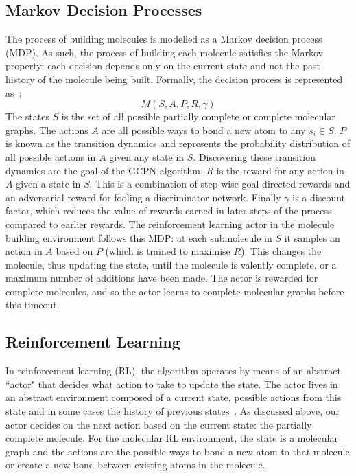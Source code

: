 \documentclass{article}
\begin{document}
\subsection{Markov Decision Processes}
The process of building molecules is modelled as a Markov decision process (MDP). As such, the process of building each molecule satisfies the Markov property: each decision depends only on the current state and not the past history of the molecule being built. Formally, the decision process is represented as~\cite{MDP}:
\[M(S, A, P, R, \gamma)\]
The states $S$ is the set of all possible partially complete or complete molecular graphs. The actions $A$ are all possible ways to bond a new atom to any $s_i\in S$. $P$ is known as the transition dynamics and represents the probability distribution of all possible actions in $A$ given any state in $S$. Discovering these transition dynamics are the goal of the GCPN algorithm. $R$ is the reward for any action in $A$ given a state in $S$. This is a combination of step-wise goal-directed rewards and an adversarial reward for fooling a discriminator network. Finally $\gamma$ is a discount factor, which reduces the value of rewards earned in later steps of the process compared to earlier rewards. The reinforcement learning actor in the molecule building environment follows this MDP: at each submolecule in $S$ it samples an action in $A$ based on $P$ (which is trained to maximise $R$). This changes the molecule, thus updating the state, until the molecule is valently complete, or a maximum number of additions have been made. The actor is rewarded for complete molecules, and so the actor learns to complete molecular graphs before this timeout.

\subsection{Reinforcement Learning}
In reinforcement learning (RL), the algorithm operates by means of an abstract ``actor" that decides what action to take to update the state. The actor lives in an abstract environment composed of a current state, possible actions from this state and in some cases the history of previous states~\cite{RL}. As discussed above, our actor decides on the next action based on the current state: the partially complete molecule. For the molecular RL environment, the state is a molecular graph and the actions are the possible ways to bond a new atom to that molecule or create a new bond between existing atoms in the molecule.
\end{document}
